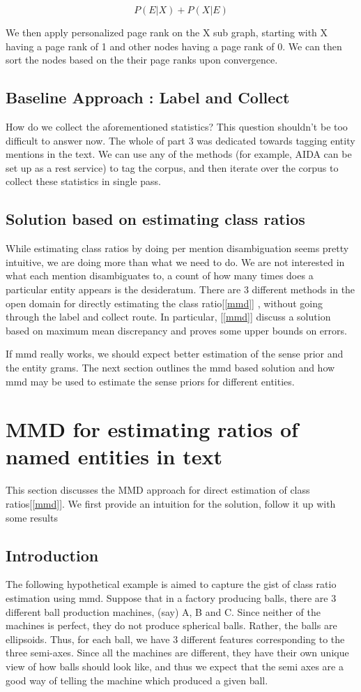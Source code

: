 \begin{equation}
\tag{3}
 P(E|X) + P(X|E) 
\end{equation}

We then apply personalized page rank on the X sub graph, starting with X having a 
page rank of 1 and other nodes having a page rank of 0. We can then sort the nodes
based on the their page ranks upon convergence. 
 


\subsection{Baseline Approach : Label and Collect}
How do we collect the aforementioned statistics?
This question shouldn't be too difficult to answer now. The whole of part 3
was dedicated towards tagging entity mentions in the text. We can use any of the 
methods (for example, AIDA can be set up as a rest service) to tag the corpus, and then iterate over the corpus to collect these statistics
in single pass. 
\subsection{Solution based on estimating class ratios}
While estimating class ratios by doing per mention disambiguation seems pretty intuitive, we are doing more than what we need to do.
We are not interested in what each mention disambiguates to, a count of how many times does a particular entity appears
is the desideratum. There are 3 different methods in the open domain for directly estimating the class ratio[\ref{mmd}] 
, without going through the label and collect route. In particular, [\ref{mmd}] discuss a solution based on maximum mean 
discrepancy and proves some upper bounds on errors. 

If mmd really works, we should expect better estimation of the sense prior and the entity grams. The next section outlines the mmd based 
solution and how mmd may be used to estimate the sense priors for different entities. 

\section{MMD for estimating ratios of named entities in text}
This section discusses the MMD approach for direct estimation of class ratios[\ref{mmd}]. We first provide an intuition for the 
solution, follow it up with some results 
\subsection{Introduction}
The following hypothetical example is aimed to capture the gist of class ratio estimation using mmd.
Suppose that in a factory producing balls, there are 3 different ball production machines, (say) A, B and C.
Since neither of the machines is perfect, they do not produce spherical balls. Rather, the balls are
ellipsoids. Thus, for each ball, we have 3 different features corresponding to the three semi-axes. 
Since all the machines are different, they have their own unique view of how balls should look like, 
and thus we expect that the semi axes are a good way of telling the machine which produced a given ball.

